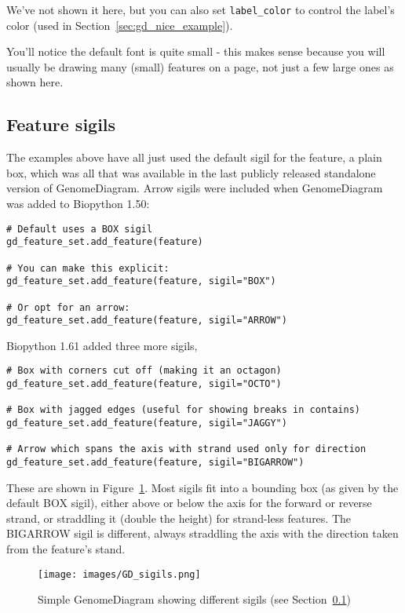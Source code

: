 We've not shown it here, but you can also set \texttt{label\_color} to
control the label's color (used in Section~\ref{sec:gd_nice_example}).

You'll notice the default font is quite small - this makes sense because
you will usually be drawing many (small) features on a page, not just a
few large ones as shown here.

\subsection{Feature sigils}
\label{sec:gd_sigils}

The examples above have all just used the default sigil for the feature, a
plain box, which was all that was available in the last publicly released standalone version of GenomeDiagram. Arrow sigils were included when
GenomeDiagram was added to Biopython 1.50:

\begin{verbatim}
# Default uses a BOX sigil
gd_feature_set.add_feature(feature)

# You can make this explicit:
gd_feature_set.add_feature(feature, sigil="BOX")

# Or opt for an arrow:
gd_feature_set.add_feature(feature, sigil="ARROW")
\end{verbatim}

\noindent
Biopython 1.61 added three more sigils,

\begin{verbatim}
# Box with corners cut off (making it an octagon)
gd_feature_set.add_feature(feature, sigil="OCTO")

# Box with jagged edges (useful for showing breaks in contains)
gd_feature_set.add_feature(feature, sigil="JAGGY")

# Arrow which spans the axis with strand used only for direction
gd_feature_set.add_feature(feature, sigil="BIGARROW")
\end{verbatim}

These are shown
in Figure~\ref{fig:gd_sigils}.
Most sigils fit into a bounding box (as given by the default BOX sigil),
either above or below the axis for the forward or reverse strand, or
straddling it (double the height) for strand-less features.
The BIGARROW sigil is different, always straddling the axis with the
direction taken from the feature's stand.

\begin{figure}[htbp]
\centering
\texttt{[image: images/GD\_sigils.png]}
\caption{Simple GenomeDiagram showing different sigils
(see Section~\ref{sec:gd_sigils})}
\label{fig:gd_sigils}
\end{figure}

